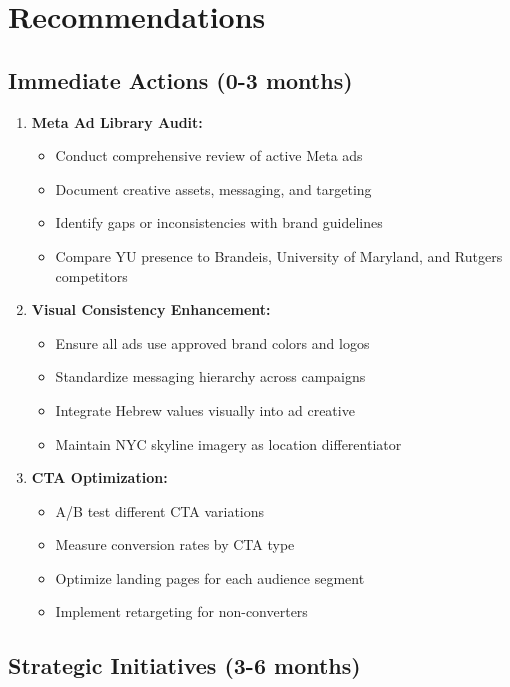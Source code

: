 \documentclass[12pt,letterpaper]{article}
\begin{document}
\section{Recommendations}

\subsection{Immediate Actions (0-3 months)}

\begin{enumerate}[leftmargin=*]
    \item \textbf{Meta Ad Library Audit:}
    \begin{itemize}
        \item Conduct comprehensive review of active Meta ads
        \item Document creative assets, messaging, and targeting
        \item Identify gaps or inconsistencies with brand guidelines
        \item Compare YU presence to Brandeis, University of Maryland, and Rutgers competitors
    \end{itemize}

    \item \textbf{Visual Consistency Enhancement:}
    \begin{itemize}
        \item Ensure all ads use approved brand colors and logos
        \item Standardize messaging hierarchy across campaigns
        \item Integrate Hebrew values visually into ad creative
        \item Maintain NYC skyline imagery as location differentiator
    \end{itemize}

    \item \textbf{CTA Optimization:}
    \begin{itemize}
        \item A/B test different CTA variations
        \item Measure conversion rates by CTA type
        \item Optimize landing pages for each audience segment
        \item Implement retargeting for non-converters
    \end{itemize}
\end{enumerate}

\subsection{Strategic Initiatives (3-6 months)}
\end{document}
